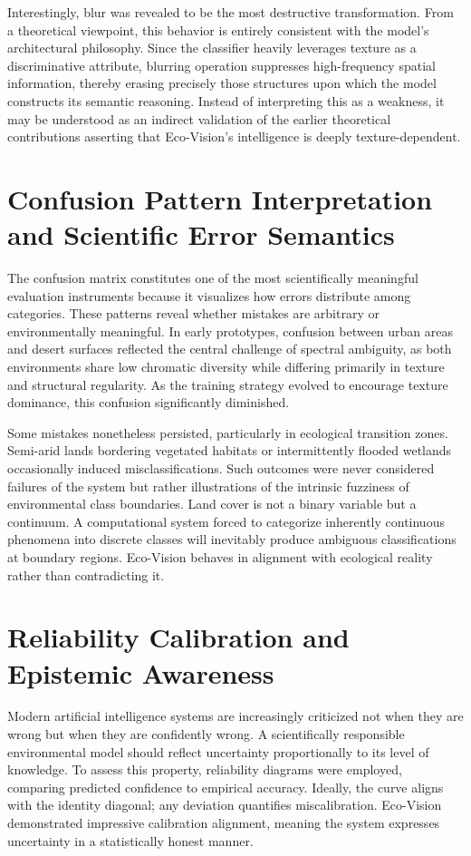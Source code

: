 \documentclass[12pt,a4paper]{report}
\begin{document}
Interestingly, blur was revealed to be the most destructive transformation. From a theoretical viewpoint, this behavior is entirely consistent with the model’s architectural philosophy. Since the classifier heavily leverages texture as a discriminative attribute, blurring operation suppresses high-frequency spatial information, thereby erasing precisely those structures upon which the model constructs its semantic reasoning. Instead of interpreting this as a weakness, it may be understood as an indirect validation of the earlier theoretical contributions asserting that Eco-Vision’s intelligence is deeply texture-dependent.

\section{Confusion Pattern Interpretation and Scientific Error Semantics}

The confusion matrix constitutes one of the most scientifically meaningful evaluation instruments because it visualizes how errors distribute among categories. These patterns reveal whether mistakes are arbitrary or environmentally meaningful. In early prototypes, confusion between urban areas and desert surfaces reflected the central challenge of spectral ambiguity, as both environments share low chromatic diversity while differing primarily in texture and structural regularity. As the training strategy evolved to encourage texture dominance, this confusion significantly diminished.

Some mistakes nonetheless persisted, particularly in ecological transition zones. Semi-arid lands bordering vegetated habitats or intermittently flooded wetlands occasionally induced misclassifications. Such outcomes were never considered failures of the system but rather illustrations of the intrinsic fuzziness of environmental class boundaries. Land cover is not a binary variable but a continuum. A computational system forced to categorize inherently continuous phenomena into discrete classes will inevitably produce ambiguous classifications at boundary regions. Eco-Vision behaves in alignment with ecological reality rather than contradicting it.

\section{Reliability Calibration and Epistemic Awareness}

Modern artificial intelligence systems are increasingly criticized not when they are wrong but when they are confidently wrong. A scientifically responsible environmental model should reflect uncertainty proportionally to its level of knowledge. To assess this property, reliability diagrams were employed, comparing predicted confidence to empirical accuracy. Ideally, the curve aligns with the identity diagonal; any deviation quantifies miscalibration. Eco-Vision demonstrated impressive calibration alignment, meaning the system expresses uncertainty in a statistically honest manner.
\end{document}
